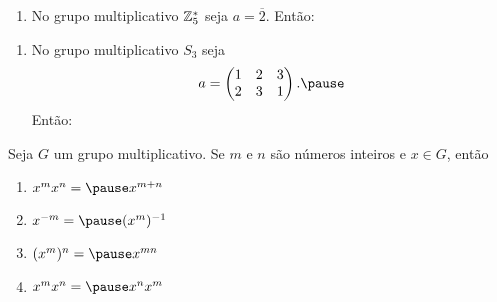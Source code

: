 \documentclass{beamer}
\begin{document}
    \begin{frame}
        \begin{exemplos}
            \begin{enumerate}[label={\roman*})]
                \conti
                \item No grupo multiplicativo $\mathbb{Z}_5^*$ \pause seja $a = \overline{2}$. \pause Ent\~ao:
                \seti
            \end{enumerate}
        \end{exemplos}
    \end{frame}

    \begin{frame}
        \begin{exemplos}
            \begin{enumerate}[label={\roman*})]
                \conti
                \item No grupo multiplicativo $S_3$ \pause seja
                \[
                    a = \begin{pmatrix}
                        1 & 2 & 3\\ 2 & 3 & 1
                    \end{pmatrix}.\pause
                \]
                Ent\~ao:
            \end{enumerate}
        \end{exemplos}
    \end{frame}

    \begin{frame}
        \begin{proposicao}
            Seja $G$ um grupo multiplicativo. \pause Se $m$ e $n$ s\~ao n\'umeros inteiros \pause e $x \in G$, \pause ent\~ao \pause
            \begin{enumerate}[label={\roman*})]
                \item $x^mx^n = \pause x^{m + n}$ \pause

                \item $x^{-m} = \pause (x^m)^{-1}$ \pause

                \item $(x^m)^n = \pause x^{mn}$ \pause

                \item $x^mx^n = \pause x^nx^m$
            \end{enumerate}
        \end{proposicao}
    \end{frame}
\end{document}
